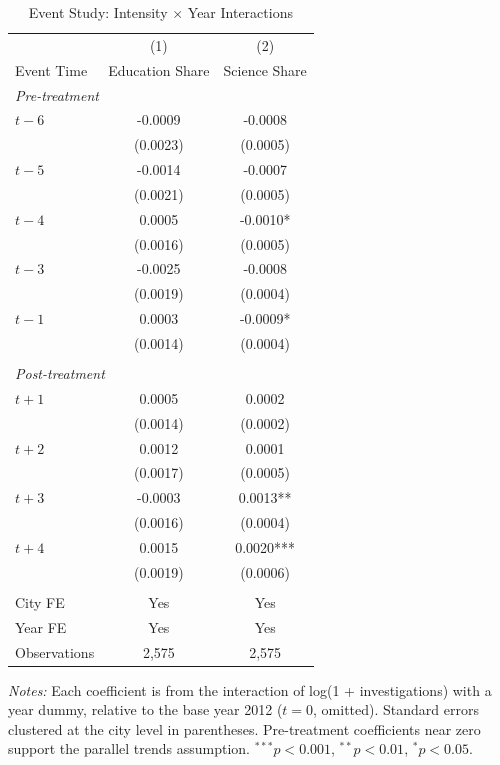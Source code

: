 \begin{table}[t]
\centering
\caption{Event Study: Intensity $\times$ Year Interactions}
\label{tab:eventstudy}
\small
\begin{tabular}{lcc}
\hline\hline
    & (1) & (2) \\
    Event Time & Education Share & Science Share \\
\hline
    \multicolumn{3}{l}{\textit{Pre-treatment}} \\[3pt]
    $t-6$ & -0.0009 & -0.0008 \\
    & (0.0023) & (0.0005) \\
    $t-5$ & -0.0014 & -0.0007 \\
    & (0.0021) & (0.0005) \\
    $t-4$ & 0.0005 & -0.0010* \\
    & (0.0016) & (0.0005) \\
    $t-3$ & -0.0025 & -0.0008 \\
    & (0.0019) & (0.0004) \\
    $t-1$ & 0.0003 & -0.0009* \\
    & (0.0014) & (0.0004) \\
    \\
    \multicolumn{3}{l}{\textit{Post-treatment}} \\[3pt]
    $t+1$ & 0.0005 & 0.0002 \\
    & (0.0014) & (0.0002) \\
    $t+2$ & 0.0012 & 0.0001 \\
    & (0.0017) & (0.0005) \\
    $t+3$ & -0.0003 & 0.0013** \\
    & (0.0016) & (0.0004) \\
    $t+4$ & 0.0015 & 0.0020*** \\
    & (0.0019) & (0.0006) \\
    \\
    City FE & Yes & Yes \\
    Year FE & Yes & Yes \\
    Observations & 2,575 & 2,575 \\
\hline\hline
\end{tabular}
\begin{tablenotes}
\item \textit{Notes:} Each coefficient is from the interaction of log(1 + investigations)
with a year dummy, relative to the base year 2012 ($t = 0$, omitted).
Standard errors clustered at the city level in parentheses.
Pre-treatment coefficients near zero support the parallel trends assumption.
$^{***}p<0.001$, $^{**}p<0.01$, $^{*}p<0.05$.
\end{tablenotes}
\end{table}
